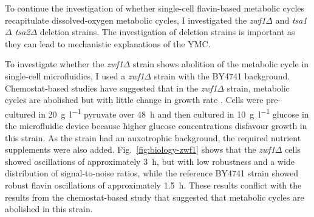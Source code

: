To continue the investigation of whether single-cell flavin-based metabolic cycles recapitulate dissolved-oxygen metabolic cycles, I investigated the \textit{zwf1$\Delta$} and \textit{tsa1$\Delta$ tsa2$\Delta$} deletion strains.
The investigation of deletion strains is important as they can lead to mechanistic explanations of the YMC\@.

To investigate whether the \textit{zwf1$\Delta$} strain shows abolition of the metabolic cycle in single-cell microfluidics, I used a \textit{zwf1$\Delta$} strain with the BY4741 background.
Chemostat-based studies have suggested that in the \textit{zwf1$\Delta$} strain, metabolic cycles are abolished but with little change in growth rate \parencite{tuCyclicChangesMetabolic2007}.
Cells were pre-cultured in \SI{20}{\gram~\litre^{-1}} pyruvate over \SI{48}{\hour} and then cultured in \SI{10}{\gram~\litre^{-1}} glucose in the microfluidic device because higher glucose concentrations disfavour growth in this strain.
As the strain had an auxotrophic background, the required nutrient supplements were also added.
%
Fig.\ \ref{fig:biology-zwf1} shows that the \textit{zwf1$\Delta$} cells showed oscillations of approximately \SI{3}{\hour}, but with low robustness and a wide distribution of signal-to-noise ratios, while the reference BY4741 strain showed robust flavin oscillations of approximately \SI{1.5}{\hour}.
These results conflict with the results from the chemostat-based study \parencite{tuCyclicChangesMetabolic2007} that suggested that metabolic cycles are abolished in this strain.

